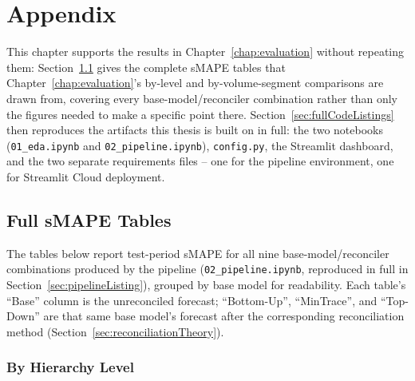 %
%
%

\chapter{Appendix}
\label{chap:appendix}

This chapter supports the results in Chapter~\ref{chap:evaluation} without repeating them: Section~\ref{sec:fullSmapeTables} gives the complete sMAPE tables that Chapter~\ref{chap:evaluation}'s by-level and by-volume-segment comparisons are drawn from, covering every base-model/reconciler combination rather than only the figures needed to make a specific point there. Section~\ref{sec:fullCodeListings} then reproduces the artifacts this thesis is built on in full: the two notebooks (\texttt{01\_eda.ipynb} and \texttt{02\_pipeline.ipynb}), \texttt{config.py}, the Streamlit dashboard, and the two separate requirements files -- one for the pipeline environment, one for Streamlit Cloud deployment.

\section{Full sMAPE Tables}
\label{sec:fullSmapeTables}

The tables below report test-period sMAPE for all nine base-model/reconciler combinations produced by the pipeline (\texttt{02\_pipeline.ipynb}, reproduced in full in Section~\ref{sec:pipelineListing}), grouped by base model for readability. Each table's ``Base'' column is the unreconciled forecast; ``Bottom-Up'', ``MinTrace'', and ``Top-Down'' are that same base model's forecast after the corresponding reconciliation method (Section~\ref{sec:reconciliationTheory}).

\subsection{By Hierarchy Level}
\label{sec:smapeByLevel}

